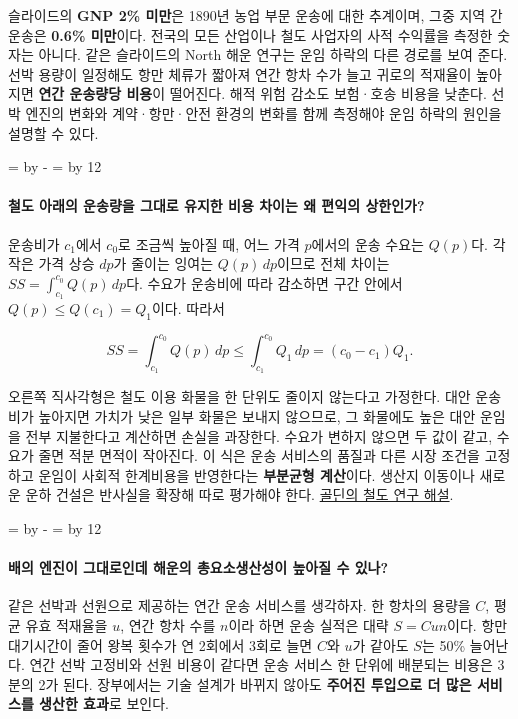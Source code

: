 \documentclass[10pt,a4paper]{article}
\newcommand{\ReserveQuestionSpace}{%
  \par\begingroup
  \dimen0=\pagegoal \advance\dimen0 by -\pagetotal
  \dimen2=\baselineskip \multiply\dimen2 by 12
  \ifdim\dimen0<\dimen2 \newpage\fi
  \endgroup}
\begin{document}
슬라이드의 \textbf{GNP 2\% 미만}은 1890년 농업 부문 운송에 대한 추계이며, 그중 지역 간 운송은 \textbf{0.6\% 미만}이다. 전국의 모든 산업이나 철도 사업자의 사적 수익률을 측정한 숫자는 아니다. 같은 슬라이드의 North 해운 연구는 운임 하락의 다른 경로를 보여 준다. 선박 용량이 일정해도 항만 체류가 짧아져 연간 항차 수가 늘고 귀로의 적재율이 높아지면 \textbf{연간 운송량당 비용}이 떨어진다. 해적 위험 감소도 보험·호송 비용을 낮춘다. 선박 엔진의 변화와 계약·항만·안전 환경의 변화를 함께 측정해야 운임 하락의 원인을 설명할 수 있다.\par

\ReserveQuestionSpace
\paragraph{철도 아래의 운송량을 그대로 유지한 비용 차이는 왜 편익의 상한인가?}
운송비가 $c_1$에서 $c_0$로 조금씩 높아질 때, 어느 가격 $p$에서의 운송 수요는 $Q(p)$다. 각 작은 가격 상승 $dp$가 줄이는 잉여는 $Q(p)\,dp$이므로 전체 차이는 $SS=\int_{c_1}^{c_0}Q(p)\,dp$다. 수요가 운송비에 따라 감소하면 구간 안에서 $Q(p)\leq Q(c_1)=Q_1$이다. 따라서\par

\[
SS=\int_{c_1}^{c_0}Q(p)\,dp\leq\int_{c_1}^{c_0}Q_1\,dp=(c_0-c_1)Q_1.
\]

오른쪽 직사각형은 철도 이용 화물을 한 단위도 줄이지 않는다고 가정한다. 대안 운송비가 높아지면 가치가 낮은 일부 화물은 보내지 않으므로, 그 화물에도 높은 대안 운임을 전부 지불한다고 계산하면 손실을 과장한다. 수요가 변하지 않으면 두 값이 같고, 수요가 줄면 적분 면적이 작아진다. 이 식은 운송 서비스의 품질과 다른 시장 조건을 고정하고 운임이 사회적 한계비용을 반영한다는 \textbf{부분균형 계산}이다. 생산지 이동이나 새로운 운하 건설은 반사실을 확장해 따로 평가해야 한다. \href{https://goldin.scholars.harvard.edu/sites/g/files/omnuum5966/files/goldin/files/cliometrics.pdf}{골딘의 철도 연구 해설}.\par

\ReserveQuestionSpace
\paragraph{배의 엔진이 그대로인데 해운의 총요소생산성이 높아질 수 있나?}
같은 선박과 선원으로 제공하는 연간 운송 서비스를 생각하자. 한 항차의 용량을 $C$, 평균 유효 적재율을 $u$, 연간 항차 수를 $n$이라 하면 운송 실적은 대략 $S=Cun$이다. 항만 대기시간이 줄어 왕복 횟수가 연 2회에서 3회로 늘면 $C$와 $u$가 같아도 $S$는 50\% 늘어난다. 연간 선박 고정비와 선원 비용이 같다면 운송 서비스 한 단위에 배분되는 비용은 3분의 2가 된다. 장부에서는 기술 설계가 바뀌지 않아도 \textbf{주어진 투입으로 더 많은 서비스를 생산한 효과}로 보인다.\par
\end{document}
